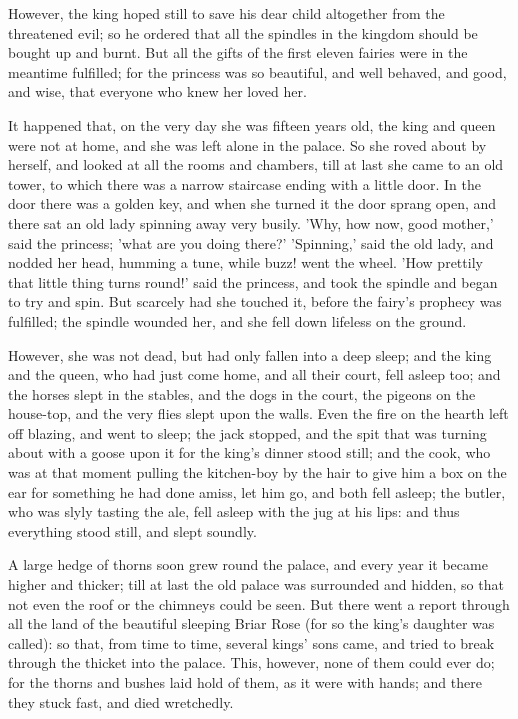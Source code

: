 \documentclass[12pt]{book}
\begin{document}
However, the king hoped still to save his dear child altogether from
the threatened evil; so he ordered that all the spindles in the
kingdom should be bought up and burnt. But all the gifts of the first
eleven fairies were in the meantime fulfilled; for the princess was so
beautiful, and well behaved, and good, and wise, that everyone who
knew her loved her.

It happened that, on the very day she was fifteen years old, the king
and queen were not at home, and she was left alone in the palace. So
she roved about by herself, and looked at all the rooms and chambers,
till at last she came to an old tower, to which there was a narrow
staircase ending with a little door. In the door there was a golden
key, and when she turned it the door sprang open, and there sat an old
lady spinning away very busily. 'Why, how now, good mother,' said the
princess; 'what are you doing there?' 'Spinning,' said the old lady,
and nodded her head, humming a tune, while buzz! went the wheel. 'How
prettily that little thing turns round!' said the princess, and took
the spindle and began to try and spin. But scarcely had she touched
it, before the fairy's prophecy was fulfilled; the spindle wounded
her, and she fell down lifeless on the ground.

However, she was not dead, but had only fallen into a deep sleep; and
the king and the queen, who had just come home, and all their court,
fell asleep too; and the horses slept in the stables, and the dogs in
the court, the pigeons on the house-top, and the very flies slept upon
the walls. Even the fire on the hearth left off blazing, and went to
sleep; the jack stopped, and the spit that was turning about with a
goose upon it for the king's dinner stood still; and the cook, who was
at that moment pulling the kitchen-boy by the hair to give him a box
on the ear for something he had done amiss, let him go, and both fell
asleep; the butler, who was slyly tasting the ale, fell asleep with
the jug at his lips: and thus everything stood still, and slept
soundly.

A large hedge of thorns soon grew round the palace, and every year it
became higher and thicker; till at last the old palace was surrounded
and hidden, so that not even the roof or the chimneys could be seen.
But there went a report through all the land of the beautiful sleeping
Briar Rose (for so the king's daughter was called): so that, from time
to time, several kings' sons came, and tried to break through the
thicket into the palace. This, however, none of them could ever do;
for the thorns and bushes laid hold of them, as it were with hands;
and there they stuck fast, and died wretchedly.
\end{document}
